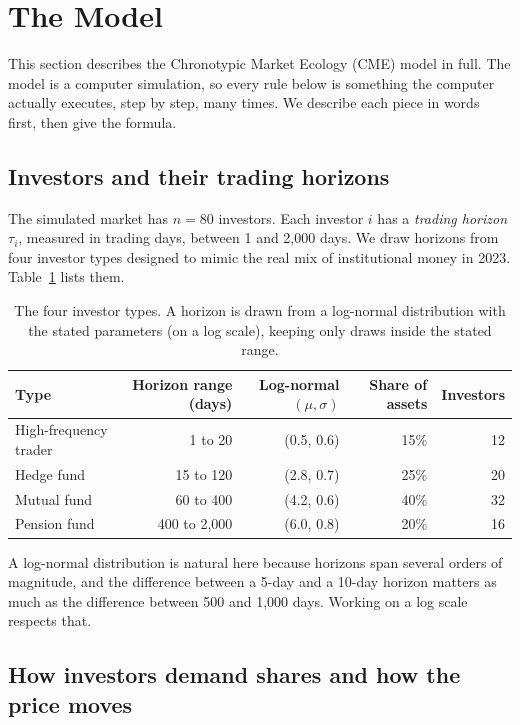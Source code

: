 \section{The Model}
\label{sec:model}

This section describes the Chronotypic Market Ecology (CME) model in full. The model is a computer simulation, so every rule below is something the computer actually executes, step by step, many times. We describe each piece in words first, then give the formula.

\subsection{Investors and their trading horizons}

The simulated market has $n=80$ investors. Each investor $i$ has a \emph{trading horizon} $\tau_i$, measured in trading days, between 1 and 2{,}000 days. We draw horizons from four investor types designed to mimic the real mix of institutional money in 2023. Table~\ref{tab:types} lists them.

\begin{table}[htbp]
\centering
\caption{The four investor types. A horizon is drawn from a log-normal distribution with the stated parameters (on a log scale), keeping only draws inside the stated range.}
\label{tab:types}
\begin{tabular}{lrrrr}
\toprule
Type & Horizon range (days) & Log-normal $(\mu,\sigma)$ & Share of assets & Investors\\
\midrule
High-frequency trader & 1 to 20 & (0.5, 0.6) & 15\% & 12\\
Hedge fund & 15 to 120 & (2.8, 0.7) & 25\% & 20\\
Mutual fund & 60 to 400 & (4.2, 0.6) & 40\% & 32\\
Pension fund & 400 to 2{,}000 & (6.0, 0.8) & 20\% & 16\\
\bottomrule
\end{tabular}
\end{table}

A log-normal distribution is natural here because horizons span several orders of magnitude, and the difference between a 5-day and a 10-day horizon matters as much as the difference between 500 and 1{,}000 days. Working on a log scale respects that.

\subsection{How investors demand shares and how the price moves}

